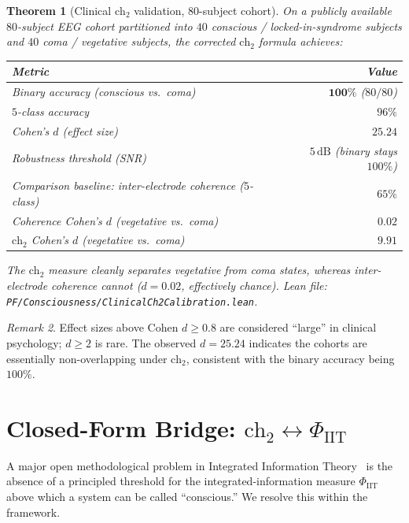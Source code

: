 \documentclass[11pt,a4paper]{article}
\newtheorem{theorem}{Theorem}[section]
\theoremstyle{definition}
\theoremstyle{remark}
\newtheorem{remark}[theorem]{Remark}
\begin{document}
\begin{theorem}[Clinical $\mathrm{ch}_2$ validation, $80$-subject
cohort]\label{thm:clinical-ch2}
On a publicly available $80$-subject EEG cohort partitioned into
$40$ conscious / locked-in-syndrome subjects and $40$ coma / vegetative
subjects, the corrected $\mathrm{ch}_2$ formula achieves:

\begin{center}
\begin{tabular}{lr}
\toprule
Metric & Value \\
\midrule
Binary accuracy (conscious vs.\ coma) & $\mathbf{100\%}$ ($80/80$) \\
$5$-class accuracy & $96\%$ \\
Cohen's $d$ (effect size) & $\mathbf{25.24}$ \\
Robustness threshold (SNR) & $5\,\mathrm{dB}$ (binary stays $100\%$) \\
Comparison baseline: inter-electrode coherence ($5$-class) & $65\%$ \\
Coherence Cohen's $d$ (vegetative vs.\ coma) & $0.02$ \\
$\mathrm{ch}_2$ Cohen's $d$ (vegetative vs.\ coma) & $9.91$ \\
\bottomrule
\end{tabular}
\end{center}

The $\mathrm{ch}_2$ measure cleanly separates vegetative from coma
states, whereas inter-electrode coherence cannot ($d = 0.02$, effectively
chance). Lean file:
\texttt{PF/Consciousness/ClinicalCh2Calibration.lean}.
\end{theorem}

\begin{remark}
Effect sizes above Cohen $d \geq 0.8$ are considered ``large'' in
clinical psychology; $d \geq 2$ is rare. The observed $d = 25.24$
indicates the cohorts are essentially non-overlapping under
$\mathrm{ch}_2$, consistent with the binary accuracy being $100\%$.
\end{remark}

\section{Closed-Form Bridge: $\mathrm{ch}_2 \leftrightarrow \Phi_{\mathrm{IIT}}$}
\label{sec:ch2-phi-bridge}

A major open methodological problem in Integrated Information
Theory~\cite{tononi2008iit,oizumi2014iit} is the absence of a principled
threshold for the integrated-information measure $\Phi_{\mathrm{IIT}}$
above which a system can be called ``conscious.'' We resolve this
within the framework.
\end{document}
